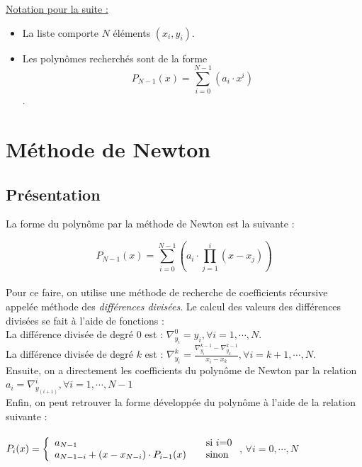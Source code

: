 \documentclass{report}
\begin{document}
    \underline{Notation pour la suite :}
    \vspace{0.1 cm}
    \begin{itemize}
      \item{La liste comporte $N$ éléments $(x_{i},y_{i})$.}
      \item{Les polynômes recherchés sont de la forme \[P_{N-1}(x)= \sum_{i=0}^{N-1} (a_{i} \cdot x^{i})\].}
    \end{itemize}
    \section{Méthode de Newton}
      \subsection{Présentation}
	\noindent La forme du polynôme par la méthode de Newton est la suivante : 
    	
    	\[P_{N-1}(x)= \sum_{i=0}^{N-1} \left( a_{i} \cdot \prod_{j=1}^{i} (x-x_{j}) \right)\] \\
	Pour ce faire, on utilise une méthode de recherche de coefficients récursive appelée méthode des \textit{différences divisées}. Le calcul des valeurs des différences divisées se fait à l'aide de fonctions : \\
    	
    	\noindent La différence divisée de degré $0$ est : $\nabla^{0}_{y_{i}} = y_{i} ,\forall i=1, \cdots, N.$\\
    	 
	\noindent La différence divisée de degré $k$ est : $\nabla^{k}_{y_{i}} = \frac{\nabla^{k-1}_{y_{i}}-\nabla^{k-1}_{y_{k}}}{x_{i}-x_{k}}, \forall i = k+1, \cdots, N.$\\
    	 
    	\noindent Ensuite, on a directement les coefficients du polynôme de Newton par la relation $a_{i} = \nabla^{i}_{y_{(i+1)}}, \forall i=1, \cdots, N-1$\\
    	 
    	\noindent Enfin, on peut retrouver la forme développée du polynôme à l'aide de la relation suivante :\\ \\ 
    	$P_{i}(x) = \left\{
	\begin{array}{l l}
	  a_{N-1} & \quad \text{si $i$=0}\\
	  a_{N-1-i} + (x-x_{N-i}) \cdot P_{i-1}(x) & \quad \text{sinon}
	\end{array} \right. $, $\forall i=0, \cdots, N$ 
\end{document}
